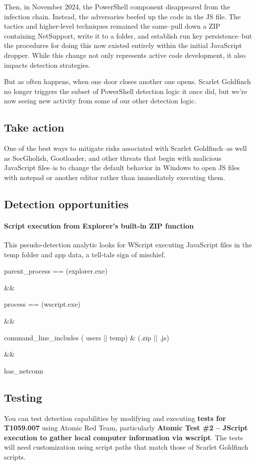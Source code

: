 Then, in November 2024, the PowerShell component disappeared from the infection chain. Instead, the adversaries beefed up the code in the JS file. The tactics and higher-level techniques remained the same–pull down a ZIP containing NetSupport, write it to a folder, and establish run key persistence–but the procedures for doing this now existed entirely within the initial JavaScript dropper. While this change not only represents active code development, it also impacts detection strategies.

But as often happens, when one door closes another one opens. Scarlet Goldfinch no longer triggers the subset of PowerShell detection logic it once did, but we’re now seeing new activity from some of our other detection logic.

\subsection{\textbf{Take action}}

One of the best ways to mitigate risks associated with Scarlet Goldfinch–as well as SocGholish, Gootloader, and other threats that begin with malicious JavaScript files–is to change the default behavior in Windows to open JS files with notepad or another editor rather than immediately executing them. 

\subsection{\textbf{Detection opportunities}}

\paragraph{\textbf{Script execution from Explorer’s built-in ZIP function}}

This pseudo-detection analytic looks for WScript executing JavaScript files in the temp folder and app data, a tell-tale sign of mischief. 

parent\_process == (explorer.exe)

\&\&

process == (wscript.exe)

\&\&

command\_line\_includes ( users || temp) \& (.zip || .js)

\&\&

has\_netconn


\subsection{\textbf{Testing}}

You can test detection capabilities by modifying and executing \textbf{tests for T1059.007} using Atomic Red Team, particularly \textbf{Atomic Test \#2 – JScript execution to gather local computer information via wscript}. The tests will need customization using script paths that match those of Scarlet Goldfinch scripts.